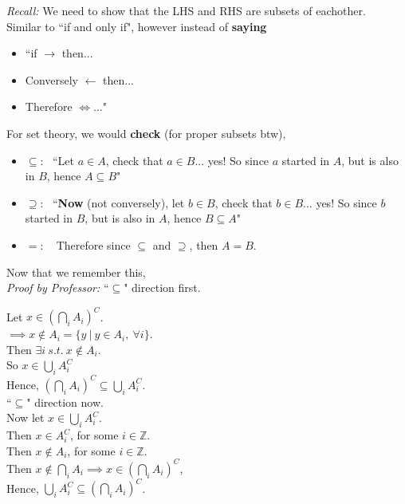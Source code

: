 \documentclass[12pt]{book}
\begin{document}
\noindent\textit{Recall:} We need to show that the LHS and RHS are subsets of eachother.\\ 
Similar to ``if and only if", however instead of \textbf{saying} 
\begin{itemize}
\item ``if $\rightarrow$ then... 
\item Conversely $\leftarrow$ then... 
\item Therefore $\iff{}$..." 
\end{itemize}

\noindent For set theory, we would \textbf{check} (for proper subsets btw), 
\begin{itemize}
\item $\subseteq :~~~$``Let $a \in A$, check that $a \in B$... yes! So since $a$ started in $A$, but is also in $B$, hence $A\subseteq B$"
\item $\supseteq :~~~$``\textbf{Now} (not conversely), let $b \in B$, check that $b \in B$... yes! So since $b$ started in $B$, but is also in $A$, hence $B\subseteq A$"
\item $=: ~~~$ Therefore since $\subseteq$ and $\supseteq$, then $A=B$.
\end{itemize}
Now that we remember this,\\

\noindent \textit{Proof by Professor:} ``$\subseteq$" direction first.

\noindent Let $x \in \left( \bigcap\limits_i A_i\right)^{C}$. \\

$\implies x \notin A_i=\{y~|~ y\in A_i,~\forall i\}$.\\

\noindent Then $\exists i~s.t.~ x\notin A_i$.\\
So $x \in \bigcup\limits_i A_i^{C}$\\
Hence, $\left( \bigcap\limits_i A_i\right)^{C}   \subseteq  \bigcup\limits_i A_i^{C}.$\\

\noindent``$\subseteq$" direction now.\\

\noindent Now let $x \in \bigcup\limits_i A_i^{C}$. \\
Then $x \in A_i^{C}$, for some $i\in \mathbb{Z}$.\\
Then $x \notin A_i$, for some $i\in \mathbb{Z}$.\\
Then $x \notin \bigcap\limits_i A_i \implies x\in \left( \bigcap\limits_i A_i\right)^{C}$,\\
Hence, $\bigcup\limits_i A_i^{C} \subseteq \left( \bigcap\limits_i A_i\right)^{C}$.\\
\end{document}
